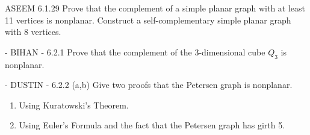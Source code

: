 \documentclass[12pt]{article}
\newenvironment{question}[2][Question]{\begin{trivlist}
\item[\hskip \labelsep {\bfseries #1}\hskip \labelsep {\bfseries #2.}]}{\end{trivlist}}
\begin{document}
\begin{question}{3} \color{blue} ASEEM \color{black}
 6.1.29  Prove that the complement of a simple planar graph with at least 11 vertices is nonplanar.  Construct a self-complementary simple planar graph with 8 vertices.
\end{question}

\begin{question}{4} - \color{blue}BIHAN\color{black} - 
6.2.1  Prove that the complement of the 3-dimensional cube $Q_3$ is nonplanar.
\end{question}

\begin{question}{5}  - \color{blue}DUSTIN\color{black} - 
6.2.2 (a,b) Give two proofs that the Petersen graph is nonplanar.
\begin{enumerate}[label=\alph*)]
  \item Using Kuratowski's Theorem.
  \item Using Euler's Formula and the fact that the Petersen graph has girth 5.
\end{enumerate}

\end{question}




\end{document}
